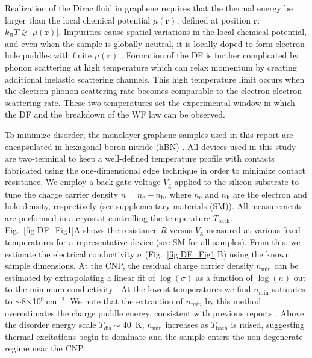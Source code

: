 Realization of the Dirac fluid in graphene requires that the thermal energy be larger than the local chemical potential $\mu(\mathbf{r})$, defined at position $\mathbf{r}$: $k_{\mathrm{B}}T\gtrsim |\mu(\mathbf{r})|$. Impurities cause spatial variations in the local chemical potential, and even when the sample is globally neutral, it is locally doped to form electron-hole puddles with finite $\mu(\mathbf{r})$ \cite{adam_self-consistent_2007, martin_observation_2008, zhang_origin_2009, xue_scanning_2011}. Formation of the DF is further complicated by phonon scattering at high temperature which can relax momentum by creating additional inelastic scattering channels. This high temperature limit occurs when the electron-phonon scattering rate becomes comparable to the electron-electron scattering rate. These two temperatures set the experimental window in which the DF and the breakdown of the WF law can be observed.

To minimize disorder, the monolayer graphene samples used in this report are encapsulated in hexagonal boron nitride (hBN) \cite{dean_boron_2010}. All devices used in this study are two-terminal to keep a well-defined temperature profile \cite{fong_ultrasensitive_2012} with contacts fabricated using the one-dimensional edge technique \cite{wang_one-dimensional_2013} in order to minimize contact resistance. We employ a back gate voltage $V_{\mathrm{g}}$ applied to the silicon substrate to tune the charge carrier density $n=n_{\mathrm{e}}-n_{\mathrm{h}}$, where $n_{\mathrm{e}}$ and $n_{\mathrm{h}}$ are the electron and hole density, respectively (see supplementary materials (SM)). All measurements are performed in a cryostat controlling the temperature $T_{\mathrm{bath}}$. Fig.~\ref{fig:DF_Fig1}A shows the resistance $R$ versus $V_{\mathrm{g}}$ measured at various fixed temperatures for a representative device (see SM for all samples). From this, we estimate the electrical conductivity $\sigma$ (Fig.~\ref{fig:DF_Fig1}B) using the known sample dimensions. At the CNP, the residual charge carrier density $n_{\mathrm{min}}$ can be estimated by extrapolating a linear fit of $\log(\sigma)$ as a function of $\log(n)$ out to the minimum conductivity \cite{couto_random_2014}. At the lowest temperatures we find $n_{\mathrm{min}}$ saturates to $\sim$8$\times$10$^9~$cm$^{-2}$. We note that the extraction of $n_{min}$ by this method overestimates the charge puddle energy, consistent with previous reports \cite{dean_boron_2010}. Above the disorder energy scale $T_{\mathrm{dis}}\sim$40~K, $n_{\mathrm{min}}$ increases as $T_{\mathrm{bath}}$ is raised, suggesting thermal excitations begin to dominate and the sample enters the non-degenerate regime near the CNP.

